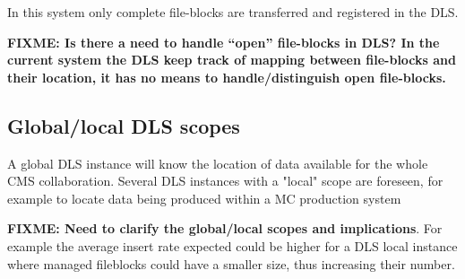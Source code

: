 \documentclass[pdftex]{cmspaper}
\begin{document}
In this system only complete file-blocks are transferred and 
registered in the DLS. 

{\bf FIXME: Is there a need to handle ``open'' file-blocks in DLS? In the current system the DLS keep track of mapping between file-blocks and their location, it has no means to handle/distinguish open file-blocks.}

\subsection{Global/local DLS scopes}

A global DLS instance will know the location of data available for the 
whole CMS collaboration.
Several DLS instances with a "local" scope are foreseen, for example 
to locate data being produced within a MC production system

{\bf FIXME: Need to clarify the global/local scopes and implications}.
For example the average insert rate expected 
could be higher for a DLS local instance where managed fileblocks could have a smaller size, thus increasing their number.
\end{document}
